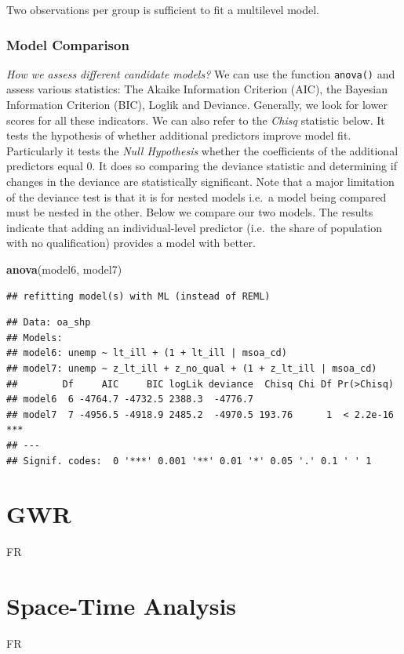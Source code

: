 \documentclass[]{book}
\newenvironment{Shaded}{\begin{snugshade}}{\end{snugshade}}
\newcommand{\KeywordTok}[1]{\textcolor[rgb]{0.13,0.29,0.53}{\textbf{#1}}}
\newcommand{\NormalTok}[1]{#1}
\begin{document}
Two observations per group is sufficient to fit a multilevel model.

\subsection{Model Comparison}\label{model-comparison}

\emph{How we assess different candidate models?} We can use the function
\texttt{anova()} and assess various statistics: The Akaike Information
Criterion (AIC), the Bayesian Information Criterion (BIC), Loglik and
Deviance. Generally, we look for lower scores for all these indicators.
We can also refer to the \emph{Chisq} statistic below. It tests the
hypothesis of whether additional predictors improve model fit.
Particularly it tests the \emph{Null Hypothesis} whether the
coefficients of the additional predictors equal 0. It does so comparing
the deviance statistic and determining if changes in the deviance are
statistically significant. Note that a major limitation of the deviance
test is that it is for nested models i.e.~a model being compared must be
nested in the other. Below we compare our two models. The results
indicate that adding an individual-level predictor (i.e.~the share of
population with no qualification) provides a model with better.

\begin{Shaded}
\begin{Highlighting}[]
\KeywordTok{anova}\NormalTok{(model6, model7)}
\end{Highlighting}
\end{Shaded}

\begin{verbatim}
## refitting model(s) with ML (instead of REML)
\end{verbatim}

\begin{verbatim}
## Data: oa_shp
## Models:
## model6: unemp ~ lt_ill + (1 + lt_ill | msoa_cd)
## model7: unemp ~ z_lt_ill + z_no_qual + (1 + z_lt_ill | msoa_cd)
##        Df     AIC     BIC logLik deviance  Chisq Chi Df Pr(>Chisq)    
## model6  6 -4764.7 -4732.5 2388.3  -4776.7                             
## model7  7 -4956.5 -4918.9 2485.2  -4970.5 193.76      1  < 2.2e-16 ***
## ---
## Signif. codes:  0 '***' 0.001 '**' 0.01 '*' 0.05 '.' 0.1 ' ' 1
\end{verbatim}

\chapter{GWR}\label{gwr}

FR

\chapter{Space-Time Analysis}\label{space-time-analysis}

FR


\end{document}
